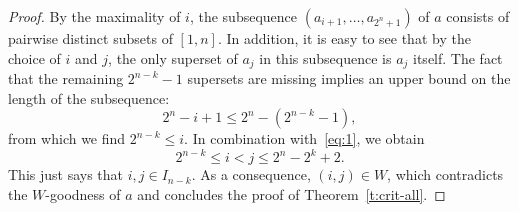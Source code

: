 \documentclass[10pt,a4paper]{amsart}
\begin{document}
\begin{proof}
  By the maximality of $i$, the subsequence $(a_{i+1}, \dots, a_{2^n+1})$ of $a$ consists of pairwise distinct subsets of $[1,n]$. In addition, it is easy to see that by the choice of $i$ and $j$, the only superset of $a_j$ in this subsequence is $a_j$ itself. The fact that the remaining $2^{n-k}-1$ supersets are missing implies an upper bound on the length of the subsequence:
  \begin{equation*}
    2^n - i + 1 \leq 2^n - (2^{n-k}-1),
  \end{equation*}
  from which we find $2^{n-k} \leq i$. In combination with~\eqref{eq:1}, we obtain
  \begin{equation}
    \label{eq:6}
    2^{n-k} \leq i < j \leq 2^n - 2^k + 2.
  \end{equation}
  This just says that $i,j\in I_{n-k}$. As a consequence, $(i,j)\in
  W$, which contradicts the $W$-goodness of $a$ and concludes the proof of Theorem~\ref{t:crit-all}.
\end{proof}
\end{document}
